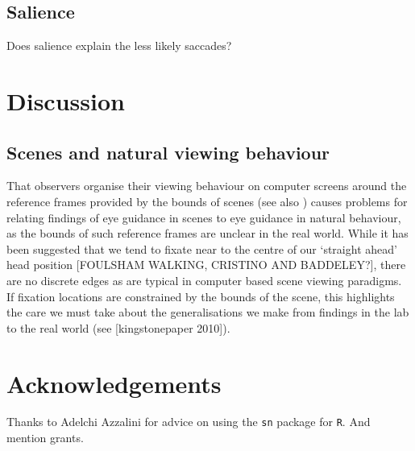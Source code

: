 \documentclass[a4paper, onecolumn, oneside, 11pt]{article}
\begin{document}
\subsection{Salience}

Does salience explain the less likely saccades? 

\section{Discussion}



\subsection{Scenes and natural viewing behaviour}
That observers organise their viewing behaviour on computer screens around the reference frames provided by the bounds of scenes (see also \cite{Stainer:2013ce}) causes problems for relating findings of eye guidance in scenes to eye guidance in natural behaviour, as the bounds of such reference frames are unclear in the real world. While it has been suggested that we tend to fixate near to the centre of our `straight ahead' head position [FOULSHAM WALKING, CRISTINO AND BADDELEY?], there are no discrete edges as are typical in computer based scene viewing paradigms. If fixation locations are constrained by the bounds of the scene, this highlights the care we must take about the generalisations we make from findings in the lab to the real world (see [kingstonepaper 2010]). 






\section*{Acknowledgements}

Thanks to Adelchi Azzalini for advice on using the \texttt{sn} package for \texttt{R}. And mention grants. 


\small

\end{document}
